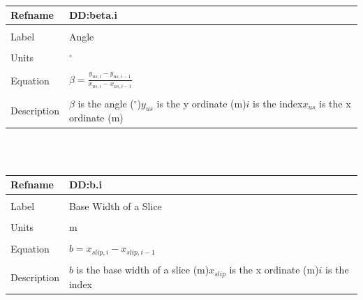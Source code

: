 \documentclass[12pt]{article}
\begin{document}
~\newline
\noindent \begin{minipage}{\textwidth}
\begin{tabular}{p{} p{}}
\toprule \textbf{Refname} & \textbf{DD:beta.i}
\label{DD:beta.i}
\\ \midrule \\
Label & Angle
\\ \midrule \\
Units & ${}^{\circ}$
\\ \midrule \\
Equation & $\beta{}=\frac{{y_{us,i}}-{y_{us,i-1}}}{{x_{us,i}}-{x_{us,i-1}}}$
\\ \midrule \\
Description & $\beta{}$ is the angle (${}^{\circ}$)\newline${y_{us}}$ is the y ordinate (m)\newline$i$ is the index\newline${x_{us}}$ is the x ordinate (m)
\\ \bottomrule \end{tabular}
\end{minipage}\\
~\newline
\noindent \begin{minipage}{\textwidth}
\begin{tabular}{p{} p{}}
\toprule \textbf{Refname} & \textbf{DD:b.i}
\label{DD:b.i}
\\ \midrule \\
Label & Base Width of a Slice
\\ \midrule \\
Units & m
\\ \midrule \\
Equation & $b={x_{slip,i}}-{x_{slip,i-1}}$
\\ \midrule \\
Description & $b$ is the base width of a slice (m)\newline${x_{slip}}$ is the x ordinate (m)\newline$i$ is the index
\\ \bottomrule \end{tabular}
\end{minipage}\\
~\newline
\end{document}
